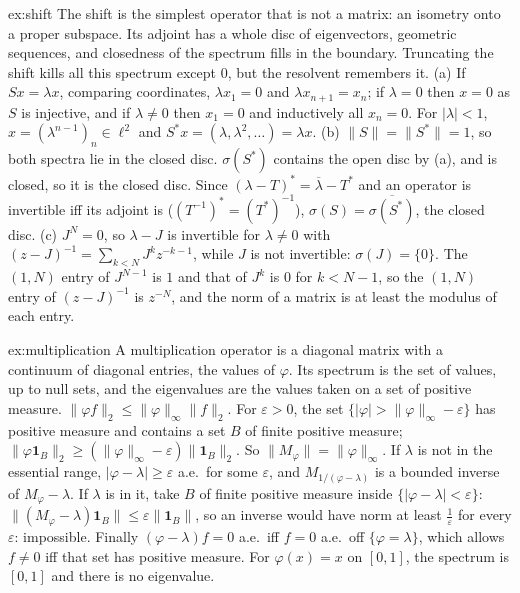 \begin{solution}{ex:shift}
\idea The shift is the simplest operator that is not a matrix: an isometry onto a proper subspace. Its adjoint has a whole disc of eigenvectors, geometric sequences, and closedness of the spectrum fills in the boundary.
Truncating the shift kills all this spectrum except $0$, but the resolvent remembers it.
\writeup (a) If $Sx=\lambda x$, comparing coordinates, $\lambda x_1=0$ and $\lambda x_{n+1}=x_n$; if $\lambda=0$ then $x=0$ as $S$ is injective, and if $\lambda\ne0$ then $x_1=0$ and inductively all $x_n=0$. For $|\lambda|<1$, $x=(\lambda^{n-1})_n\in\ell^2$ and
$S^*x=(\lambda,\lambda^2,\dots)=\lambda x$. (b) $\|S\|=\|S^*\|=1$, so both spectra lie in the closed disc. $\sigma(S^*)$ contains the open disc by (a), and is closed, so it is the closed disc. Since $(\lambda-T)^*=\overline\lambda-T^*$
and an operator is invertible iff its adjoint is ($(T^{-1})^*=(T^*)^{-1}$), $\sigma(S)=\overline{\sigma(S^*)}$, the closed disc. (c) $J^N=0$, so $\lambda-J$ is invertible for $\lambda\ne0$ with $(z-J)^{-1}=\sum_{k<N}J^kz^{-k-1}$, while $J$ is not
invertible: $\sigma(J)=\{0\}$. The $(1,N)$ entry of $J^{N-1}$ is $1$ and that of $J^k$ is $0$ for $k<N-1$, so the $(1,N)$ entry of $(z-J)^{-1}$ is $z^{-N}$, and the norm of a matrix is at least the modulus of each entry.
\end{solution}

\begin{solution}{ex:multiplication}
\idea A multiplication operator is a diagonal matrix with a continuum of diagonal entries, the values of $\varphi$. Its spectrum is the set of values, up to null sets, and the eigenvalues are the values taken on a set of positive measure.
\writeup $\|\varphi f\|_2\le\|\varphi\|_\infty\|f\|_2$. For $\varepsilon>0$, the set $\{|\varphi|>\|\varphi\|_\infty-\varepsilon\}$ has positive measure and contains a set $B$ of finite positive measure; $\|\varphi\mathbf 1_B\|_2\ge(\|\varphi\|_\infty-\varepsilon)\|\mathbf 1_B\|_2$.
So $\|M_\varphi\|=\|\varphi\|_\infty$. If $\lambda$ is not in the essential range, $|\varphi-\lambda|\ge\varepsilon$ a.e.\ for some $\varepsilon$, and $M_{1/(\varphi-\lambda)}$ is a bounded inverse of $M_\varphi-\lambda$. If $\lambda$ is in it, take $B$ of finite positive
measure inside $\{|\varphi-\lambda|<\varepsilon\}$: $\|(M_\varphi-\lambda)\mathbf 1_B\|\le\varepsilon\|\mathbf 1_B\|$, so an inverse would have norm at least $\frac1\varepsilon$ for every $\varepsilon$: impossible. Finally $(\varphi-\lambda)f=0$ a.e.\ iff $f=0$
a.e.\ off $\{\varphi=\lambda\}$, which allows $f\ne0$ iff that set has positive measure. For $\varphi(x)=x$ on $[0,1]$, the spectrum is $[0,1]$ and there is no eigenvalue.
\end{solution}

